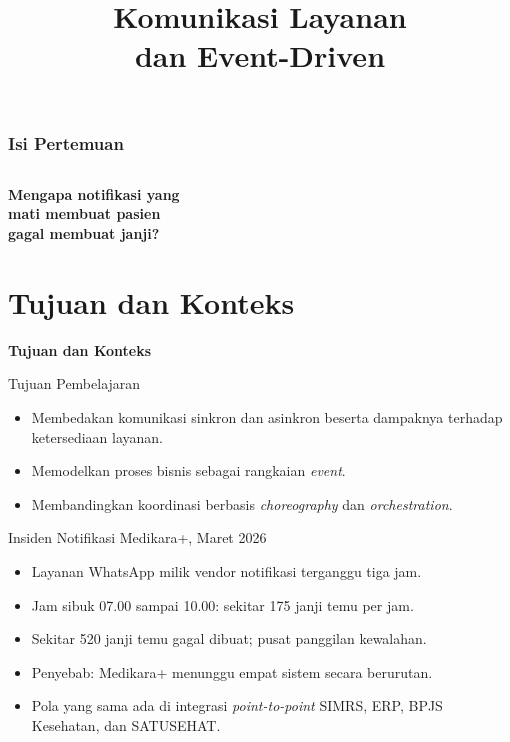 \documentclass[aspectratio=169, table, 12pt]{beamer}
\title{\Huge Komunikasi Layanan\\ \vspace{10pt} dan Event-Driven}
\begin{document}
\frame{\titlepage}

\begin{frame}
  \frametitle{Isi Pertemuan}
  \vspace{14pt}
  \begin{columns}[t]
    {\small\tableofcontents[sections={1-4}]}

    {\small\tableofcontents[sections={5-8}]}
  \end{columns}
\end{frame}

\begin{frame}{\hfill}
  \centering
  \Huge{\textbf{Mengapa notifikasi yang\\mati membuat pasien\\gagal membuat janji?}}
\end{frame}

\section{Tujuan dan Konteks}

\begin{frame}{\hfill}
  \centering
  \Huge{\textbf{Tujuan dan Konteks}}
\end{frame}

\begin{frame}{{\Large Tujuan Pembelajaran}}
  \vspace{10pt}
  \begin{itemize}
    \item Membedakan komunikasi sinkron dan asinkron beserta dampaknya terhadap
          ketersediaan layanan.
    \item Memodelkan proses bisnis sebagai rangkaian \textit{event}.
    \item Membandingkan koordinasi berbasis \textit{choreography} dan
          \textit{orchestration}.
  \end{itemize}
\end{frame}

\begin{frame}{{\Large Insiden Notifikasi Medikara+, Maret 2026}}
  \vspace{6pt}
  \begin{itemize}
    \item Layanan WhatsApp milik vendor notifikasi terganggu tiga jam.
    \item Jam sibuk 07.00 sampai 10.00: sekitar 175 janji temu per jam.
    \item Sekitar 520 janji temu gagal dibuat; pusat panggilan kewalahan.
    \item Penyebab: Medikara+ menunggu empat sistem secara berurutan.
    \item Pola yang sama ada di integrasi \textit{point-to-point} SIMRS, ERP,
          BPJS Kesehatan, dan SATUSEHAT.
  \end{itemize}
\end{frame}
\end{document}
